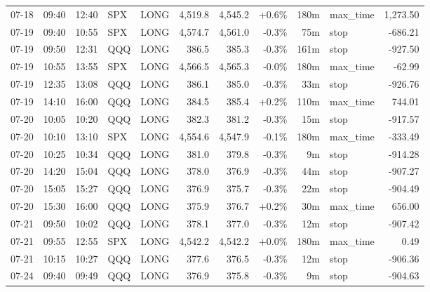 \documentclass[11pt,a4paper,twoside]{article}
\begin{document}
\begin{center}
\begin{longtable}{>{\color{txtmain}}l l l l l r r r r >{\color{txtmain}}l r}
07-18 & 09:40 & 12:40 & SPX & LONG & 4,519.8 & 4,545.2 & \textcolor{wingreen}{+0.6\%} & 180m & max\_time & \textcolor{wingreen}{1,273.50} \\
07-19 & 09:40 & 10:55 & SPX & LONG & 4,574.7 & 4,561.0 & \textcolor{lossred}{-0.3\%} & 75m & stop & \textcolor{lossred}{-686.21} \\
07-19 & 09:50 & 12:31 & QQQ & LONG & 386.5 & 385.3 & \textcolor{lossred}{-0.3\%} & 161m & stop & \textcolor{lossred}{-927.50} \\
07-19 & 10:55 & 13:55 & SPX & LONG & 4,566.5 & 4,565.3 & \textcolor{lossred}{-0.0\%} & 180m & max\_time & \textcolor{lossred}{-62.99} \\
07-19 & 12:35 & 13:08 & QQQ & LONG & 386.1 & 385.0 & \textcolor{lossred}{-0.3\%} & 33m & stop & \textcolor{lossred}{-926.76} \\
07-19 & 14:10 & 16:00 & QQQ & LONG & 384.5 & 385.4 & \textcolor{wingreen}{+0.2\%} & 110m & max\_time & \textcolor{wingreen}{744.01} \\
07-20 & 10:05 & 10:20 & QQQ & LONG & 382.3 & 381.2 & \textcolor{lossred}{-0.3\%} & 15m & stop & \textcolor{lossred}{-917.57} \\
07-20 & 10:10 & 13:10 & SPX & LONG & 4,554.6 & 4,547.9 & \textcolor{lossred}{-0.1\%} & 180m & max\_time & \textcolor{lossred}{-333.49} \\
07-20 & 10:25 & 10:34 & QQQ & LONG & 381.0 & 379.8 & \textcolor{lossred}{-0.3\%} & 9m & stop & \textcolor{lossred}{-914.28} \\
07-20 & 14:20 & 15:04 & QQQ & LONG & 378.0 & 376.9 & \textcolor{lossred}{-0.3\%} & 44m & stop & \textcolor{lossred}{-907.27} \\
07-20 & 15:05 & 15:27 & QQQ & LONG & 376.9 & 375.7 & \textcolor{lossred}{-0.3\%} & 22m & stop & \textcolor{lossred}{-904.49} \\
07-20 & 15:30 & 16:00 & QQQ & LONG & 375.9 & 376.7 & \textcolor{wingreen}{+0.2\%} & 30m & max\_time & \textcolor{wingreen}{656.00} \\
07-21 & 09:50 & 10:02 & QQQ & LONG & 378.1 & 377.0 & \textcolor{lossred}{-0.3\%} & 12m & stop & \textcolor{lossred}{-907.42} \\
07-21 & 09:55 & 12:55 & SPX & LONG & 4,542.2 & 4,542.2 & \textcolor{wingreen}{+0.0\%} & 180m & max\_time & \textcolor{wingreen}{0.49} \\
07-21 & 10:15 & 10:27 & QQQ & LONG & 377.6 & 376.5 & \textcolor{lossred}{-0.3\%} & 12m & stop & \textcolor{lossred}{-906.36} \\
07-24 & 09:40 & 09:49 & QQQ & LONG & 376.9 & 375.8 & \textcolor{lossred}{-0.3\%} & 9m & stop & \textcolor{lossred}{-904.63} \\

\end{longtable}
\end{center}
\end{document}
